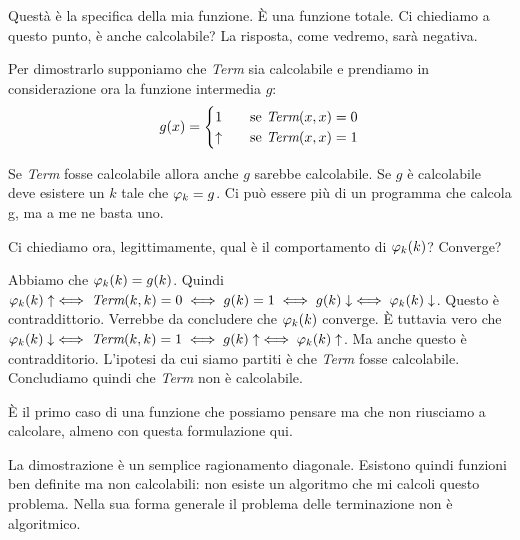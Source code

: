 Questà è la specifica della mia funzione. È una funzione totale. Ci chiediamo a questo punto, è
anche calcolabile? La risposta, come vedremo, sarà negativa.

Per dimostrarlo supponiamo che \textit{Term} sia calcolabile e prendiamo in considerazione ora la
funzione intermedia $g$:
\begin{equation*}
    g(x) =
    \begin{cases}
        1 \quad & \text{se $\textit{Term}(x,x) = 0$} \\
        \uparrow \quad & \text{se $\textit{Term}(x,x) = 1$} 
    \end{cases}
\end{equation*}

Se \textit{Term} fosse calcolabile allora anche $g$ sarebbe calcolabile. Se $g$ è calcolabile deve
esistere un $k$ tale che $\varphi_{k} = g$. Ci può essere più di un programma che calcola g, ma a me ne
basta uno.

Ci chiediamo ora, legittimamente, qual è il comportamento di $\varphi_{k}(k)$? Converge?

Abbiamo che $\varphi_{k}(k) = g(k)$. Quindi $\varphi_{k}(k) \uparrow \iff \textit{Term}(k,k) = 0 \iff g(k) = 1
\iff g(k) \downarrow \iff \varphi_{k}(k) \downarrow$. Questo è contraddittorio. Verrebbe da concludere che
$\varphi_{k}(k)$ converge. È tuttavia vero che $\varphi_{k}(k) \downarrow \iff \textit{Term}(k,k) = 1 \iff g(k)
\uparrow \iff \varphi_{k}(k) \uparrow$. Ma anche questo è contradditorio. L'ipotesi da cui siamo partiti
è che \textit{Term} fosse calcolabile. Concludiamo quindi che \textit{Term} non è calcolabile.

%
%
%
%
%
%
%
%

È il primo caso di una funzione che possiamo pensare ma che non riusciamo a calcolare, almeno con questa
formulazione qui.

La dimostrazione è un semplice ragionamento diagonale. Esistono quindi funzioni ben definite ma non
calcolabili: non esiste un algoritmo che mi calcoli questo problema. Nella sua forma generale il
problema delle terminazione non è algoritmico.

